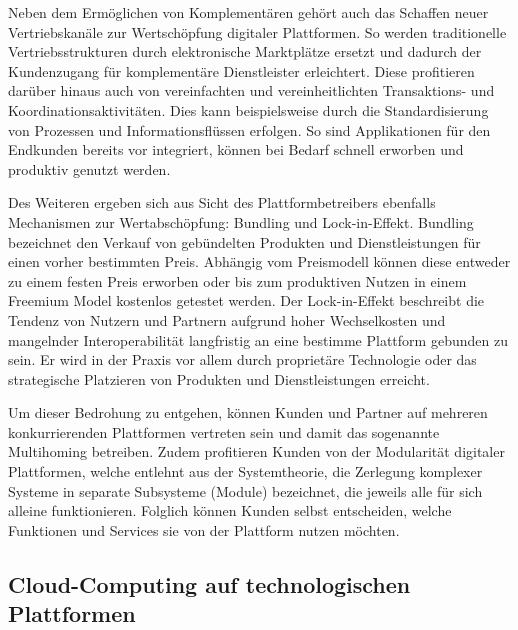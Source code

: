 Neben dem Ermöglichen von Komplementären gehört auch das Schaffen neuer Vertriebskanäle zur Wertschöpfung digitaler Plattformen. So werden traditionelle Vertriebsstrukturen durch elektronische Marktplätze ersetzt und dadurch der Kundenzugang für komplementäre Dienstleister erleichtert. Diese profitieren darüber hinaus auch von vereinfachten und vereinheitlichten Transaktions- und Koordinationsaktivitäten. Dies kann beispielsweise durch die Standardisierung von Prozessen und Informationsflüssen erfolgen. So sind Applikationen für den Endkunden bereits vor integriert, können bei Bedarf schnell erworben und produktiv genutzt werden.\autocite[Vgl.][S. 599f.]{HAHN2016}

Des Weiteren ergeben sich aus Sicht des Plattformbetreibers ebenfalls Mechanismen zur Wertabschöpfung: Bundling und Lock-in-Effekt. Bundling bezeichnet den Verkauf von gebündelten Produkten und Dienstleistungen für einen vorher bestimmten Preis. Abhängig vom Preismodell können diese entweder zu einem festen Preis erworben oder bis zum produktiven Nutzen in einem Freemium Model kostenlos getestet werden.\autocite[Vgl.][S. 178-185]{TEECE2010} Der Lock-in-Effekt beschreibt die Tendenz von Nutzern und Partnern aufgrund hoher Wechselkosten und mangelnder Interoperabilität langfristig an eine bestimme Plattform gebunden zu sein. \autocite[Vgl.][S. 22]{STEUR2022} Er wird in der Praxis vor allem durch proprietäre Technologie oder das strategische Platzieren von Produkten und Dienstleistungen erreicht. \autocite[Vgl.][S. 704]{BALLON2011}

Um dieser Bedrohung zu entgehen, können Kunden und Partner auf mehreren konkurrierenden Plattformen vertreten sein und damit das sogenannte Multihoming betreiben. \autocite[Vgl.][S. 461ff]{CENNAMO2018} Zudem profitieren Kunden von der Modularität digitaler Plattformen, welche entlehnt aus der Systemtheorie, die Zerlegung komplexer Systeme in separate Subsysteme (Module) bezeichnet, die jeweils alle für sich alleine funktionieren. \autocite[Vgl.][S. 2]{LECHNER2019} Folglich können Kunden selbst entscheiden, welche Funktionen und Services sie von der Plattform nutzen möchten.


\subsection{Cloud-Computing auf technologischen Plattformen}


